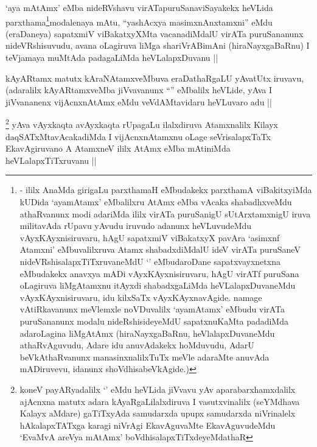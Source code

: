 \begin{artha}
`aya mAtAmx' eMba nideRVshavu virATapuruSanaviSayakekx heVLida
  parxthama\footnote[1]{- ililx AnaMda girigaLu parxthamaH eMbudakekx
    parxthamA viBakitxyiMda kUDida `ayamAtamx' eMbalilxru AtAmx eMba
    vAcaka shabadhxveMdu athaRvanunx modi adariMda ililx virATa
    puruSanigU sUtArxtamxnigU iruva militavAda rUpavu yAvudu iruvudo
    adanunx heVLuvudeMdu vAyxKAyxnisiruvaru, hAgU sapatxmiV viBakatxyX
    pavAra `asimxnf Atamxni' eMbuvalilxruva Atamx shabadxdiMdalU ideV
    virATa puruSaneV nideVRshisalapxTiTxruvaneMdU `\stext'
    eMbudaroDane sapatxvayxnetxna eMbudakekx anavxya mADi
    vAyxKAyxnisiruvaru, hAgU virATf puruSana oLagiruva liMgAtamxnu
\stext itAyxdi shabadxgaLiMda heVLalapxDuvaneMdu vAyxKAyxnisiruvaru,
idu kilxSaTx vAyxKAyxnavAgide. namage vAtiRkavanunx meVlemxle
noVDuvalilx `ayamAtamx' eMbudu virATa puruSananunx modalu
nideRshisideyeMdU sapatxnuKaMta padadiMda adaroLagina liMgAtAmx
(hiraNayxgaBaRnu, heVlalapxDuvaneMdu athaRvAguvudu, Adare idu
anuvAdakekx hoMduvudu, AdarU beVkAthaRvanunx manasinxnalilxTuTx meVle
adaraMte anuvAda mADiruvevu, idanunx shoVdhisabeVkAgide.)}modalenaya mAtu, ``yashAcxya
  masimxnAnxtamxni'' eMdu (eraDaneya) sapatxmiV viBakatxyXMta
  vacanadiMdalU virATa puruSananunx nideVRshisuvudu, avana oLagiruva
  liMga shariVrABimAni (hiraNayxgaBaRnu) I teVjamaya muMtAda
  padagaLiMda heVLalapxDuvanu ||
\end{artha}

\begin{artha}
kAyARtamx matutx kAraNAtamxveMbuva eraDathaRgaLU yAvatUtx iruvavu,
(adaralilx kAyARtamxveMba jiVvavanunx ``\stext'' eMbalilx heVLide,
yAva I jiVvananenx vijAcnxnAtAmx eMdu veVdAMtavidaru heVLuvaro adu ||
\end{artha}


\begin{artha}
\footnote[2]{koneV payARyadalilx `\stext' eMdu heVLida jiVvavu yAv
  aparabarxhamxdalilx ajAcnxna matutx adara kAyaRgaLilalxdiruva I
  vasutxvinalilx (seYMdhava Kalayx aMdare) gaTiTxyAda samudarxda upupx
  samudarxda niVrinalelx hAkalapxTATxga karagi niVrAgi EkavAguvaMte
  EkavAguvudeMdu `EvaMvA areV\s ya mAtAmx'
  boVdhisalapxTiTxdeyeMdathaR}
yAva vAyxkaqta avAyxkaqta rUpagaLu ilalxdiruva Atamxnalilx Kilayx
daqSATxMtavAcakadiMda I vijAcnxnAtamxnu oLage seVrisalapxTaTx
EkavAgiruvano A AtamxneV ililx AtAmx eMba mAtiniMda
heVLalapxTiTxruvanu ||
\end{artha}

